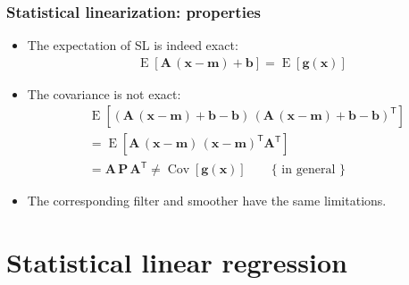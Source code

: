 \documentclass[first=dgreen,second=purple,presentation]{elecslides}
\newcommand{\mbf}[1]{\mathbf{#1}}
\newcommand{\T}[0]{\mathsf{T}}
\DeclareMathOperator{\Cov}{Cov}
\DeclareMathOperator{\E}{E}
\newcommand{\vb}{\mbf{b}}
\newcommand{\vg}{\mbf{g}}
\newcommand{\vm}{\mbf{m}}
\newcommand{\vx}{\mbf{x}}
\newcommand{\MA}{\mbf{A}}
\newcommand{\MP}{\mbf{P}}
\begin{document}
\begin{frame}
 \frametitle{Statistical linearization: properties}

\begin{itemize}[<+->]
\item The \alert{expectation} of SL is indeed \alert{exact}:
%
\begin{equation}
\begin{split}
  \E\left[ \MA \, (\vx - \vm) + \vb \right] = \E\left[ \vg(\vx) \right]
\end{split}
\nonumber
\end{equation}

\item The \alert{covariance is not exact}:
%
\begin{equation}
\begin{split}
  &\E\left[ (\MA \, (\vx - \vm) + \vb - \vb) \, (\MA \, (\vx - \vm) + \vb - \vb)^\T \right] \\
  &= \E\left[ \MA \, (\vx - \vm) \, (\vx - \vm)^\T \MA^\T \right] \\
  &= \MA \, \MP \, \MA^\T \ne \Cov\left[ \vg(\vx) \right]  \qquad  \{ \text{ in general } \}
\end{split}
\nonumber
\end{equation}

\item The corresponding filter and smoother have the \alert{same limitations}.

\end{itemize}
\end{frame}



\section{Statistical linear regression}
\end{document}
